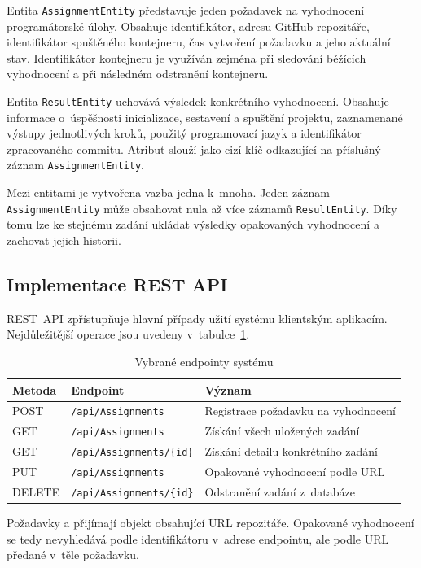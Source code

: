 \documentclass[
  biblatex,
  figures,
  tables,
  glossaries,
  index
]{kidiplom}
\begin{document}
Entita \texttt{AssignmentEntity} představuje jeden požadavek na vyhodnocení programátorské úlohy. Obsahuje identifikátor, adresu GitHub repozitáře, identifikátor spuštěného kontejneru, čas vytvoření požadavku a jeho aktuální stav. Identifikátor kontejneru je využíván zejména při sledování běžících vyhodnocení a při následném odstranění kontejneru.

Entita \texttt{ResultEntity} uchovává výsledek konkrétního vyhodnocení. Obsahuje informace o~úspěšnosti inicializace, sestavení a spuštění projektu, zaznamenané výstupy jednotlivých kroků, použitý programovací jazyk a identifikátor zpracovaného commitu. Atribut  slouží jako cizí klíč odkazující na příslušný záznam \texttt{AssignmentEntity}.

Mezi entitami je vytvořena vazba jedna k~mnoha. Jeden záznam \linebreak{}\texttt{AssignmentEntity} může obsahovat nula až více záznamů \texttt{ResultEntity}. Díky tomu lze ke stejnému zadání ukládat výsledky opakovaných vyhodnocení a zachovat jejich historii.


\subsection{Implementace REST API}
REST~API zpřístupňuje hlavní případy užití systému klientským aplikacím. Nejdůležitější operace jsou uvedeny v~tabulce~\ref{tab:endpoints}.

\begin{table}[h]
	\centering
	\small
		\begin{tabular}{lll}
			\hline
			\textbf{Metoda} & \textbf{Endpoint} & \textbf{Význam} \\ \hline
			POST & \texttt{/api/Assignments} & Registrace požadavku na vyhodnocení \\ 
			GET & \texttt{/api/Assignments} & Získání všech uložených zadání  \\ 
			GET & \texttt{/api/Assignments/\{id\}} & Získání detailu konkrétního zadání \\
			PUT & \texttt{/api/Assignments} & Opakované vyhodnocení podle URL \\ 
			DELETE & \texttt{/api/Assignments/\{id\}} & Odstranění zadání z~databáze \\
			\hline
		\end{tabular}
	\caption{Vybrané endpointy systému}
	\label{tab:endpoints}
\end{table}

Požadavky  a  přijímají objekt obsahující URL repozitáře. Opakované vyhodnocení se tedy nevyhledává podle identifikátoru v~adrese endpointu, ale podle URL předané v~těle požadavku.
\end{document}
